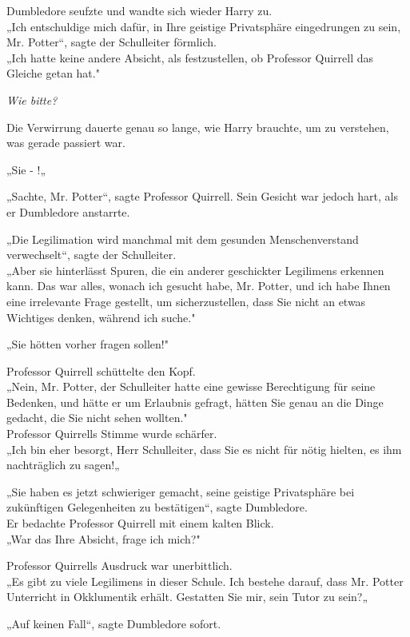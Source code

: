 {Dumbledore seufzte und wandte sich wieder Harry zu.\\ „Ich entschuldige mich dafür, in Ihre geistige Privatsphäre eingedrungen zu sein, Mr. Potter“, sagte der Schulleiter förmlich.\\ „Ich hatte keine andere Absicht, als festzustellen, ob Professor Quirrell das Gleiche getan hat."

\emph{Wie bitte?}

Die Verwirrung dauerte genau so lange, wie Harry brauchte, um zu verstehen, was gerade passiert war.

„Sie - !„

„Sachte, Mr. Potter“, sagte Professor Quirrell. Sein Gesicht war jedoch hart, als er Dumbledore anstarrte.

„Die Legilimation wird manchmal mit dem gesunden Menschenverstand verwechselt“, sagte der Schulleiter.\\ „Aber sie hinterlässt Spuren, die ein anderer geschickter Legilimens erkennen kann. Das war alles, wonach ich gesucht habe, Mr. Potter, und ich habe Ihnen eine irrelevante Frage gestellt, um sicherzustellen, dass Sie nicht an etwas Wichtiges denken, während ich suche."

„Sie hötten vorher fragen sollen!"

Professor Quirrell schüttelte den Kopf.\\ „Nein, Mr. Potter, der Schulleiter hatte eine gewisse Berechtigung für seine Bedenken, und hätte er um Erlaubnis gefragt, hätten Sie genau an die Dinge gedacht, die Sie nicht sehen wollten."\\ Professor Quirrells Stimme wurde schärfer.\\ „Ich bin eher besorgt, Herr Schulleiter, dass Sie es nicht für nötig hielten, es ihm nachträglich zu sagen!„

„Sie haben es jetzt schwieriger gemacht, seine geistige Privatsphäre bei zukünftigen Gelegenheiten zu bestätigen“, sagte Dumbledore.\\ Er bedachte Professor Quirrell mit einem kalten Blick.\\ „War das Ihre Absicht, frage ich mich?"

Professor Quirrells Ausdruck war unerbittlich.\\ „Es gibt zu viele Legilimens in dieser Schule. Ich bestehe darauf, dass Mr. Potter Unterricht in Okklumentik erhält. Gestatten Sie mir, sein Tutor zu sein?„

„Auf keinen Fall“, sagte Dumbledore sofort.

}
